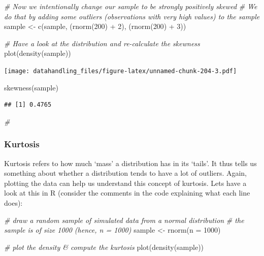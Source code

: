 \documentclass[
  12pt,
]{style/krantz}
\newenvironment{Shaded}{\begin{snugshade}}{\end{snugshade}}
\newcommand{\AttributeTok}[1]{\textcolor[rgb]{0.77,0.63,0.00}{#1}}
\newcommand{\CommentTok}[1]{\textcolor[rgb]{0.56,0.35,0.01}{\textit{#1}}}
\newcommand{\DecValTok}[1]{\textcolor[rgb]{0.00,0.00,0.81}{#1}}
\newcommand{\FunctionTok}[1]{\textcolor[rgb]{0.00,0.00,0.00}{#1}}
\newcommand{\NormalTok}[1]{#1}
\newcommand{\OtherTok}[1]{\textcolor[rgb]{0.56,0.35,0.01}{#1}}
\newcommand{\SpecialCharTok}[1]{\textcolor[rgb]{0.00,0.00,0.00}{#1}}
\begin{document}
\begin{Shaded}
\begin{Highlighting}[]
\CommentTok{\# Now we intentionally change our sample to be strongly positively skewed}
\CommentTok{\# We do that by adding some outliers (observations with very high values) to the sample }
\NormalTok{sample }\OtherTok{\textless{}{-}} \FunctionTok{c}\NormalTok{(sample, (}\FunctionTok{rnorm}\NormalTok{(}\DecValTok{200}\NormalTok{) }\SpecialCharTok{+} \DecValTok{2}\NormalTok{), (}\FunctionTok{rnorm}\NormalTok{(}\DecValTok{200}\NormalTok{) }\SpecialCharTok{+} \DecValTok{3}\NormalTok{))}

\CommentTok{\# Have a look at the distribution and re{-}calculate the skewness}
\FunctionTok{plot}\NormalTok{(}\FunctionTok{density}\NormalTok{(sample))}
\end{Highlighting}
\end{Shaded}

\texttt{[image: datahandling\_files/figure-latex/unnamed-chunk-204-3.pdf]}

\begin{Shaded}
\begin{Highlighting}[]
\FunctionTok{skewness}\NormalTok{(sample)}
\end{Highlighting}
\end{Shaded}

\begin{verbatim}
## [1] 0.4765
\end{verbatim}

\begin{Shaded}
\begin{Highlighting}[]
\CommentTok{\#}
\end{Highlighting}
\end{Shaded}

\hypertarget{kurtosis}{%
\subsubsection{Kurtosis}\label{kurtosis}}

Kurtosis refers to how much `mass' a distribution has in its `tails'. It thus tells us something about whether a distribution tends to have a lot of outliers. Again, plotting the data can help us understand this concept of kurtosis. Lets have a look at this in R (consider the comments in the code explaining what each line does):

\begin{Shaded}
\begin{Highlighting}[]
\CommentTok{\# draw a random sample of simulated data from a normal distribution}
\CommentTok{\# the sample is of size 1000 (hence, n = 1000)}
\NormalTok{sample }\OtherTok{\textless{}{-}} \FunctionTok{rnorm}\NormalTok{(}\AttributeTok{n =} \DecValTok{1000}\NormalTok{)}

\CommentTok{\# plot the density \& compute the kurtosis}
\FunctionTok{plot}\NormalTok{(}\FunctionTok{density}\NormalTok{(sample))}
\end{Highlighting}
\end{Shaded}
\end{document}
